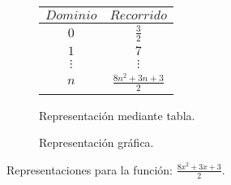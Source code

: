 \begin{figure}[h]
\centering
\begin{subfigure}[A]{0.3\textwidth}
\centering
\begin{tabular}{c|c}
$Dominio$ & $Recorrido$ \\ \hline
\hline
$0$ & $\frac{3}{2}$ \\ \hline
$1$ & $7$ \\ \hline
$\vdots$ & $\vdots$ \\ \hline
$n$& $\frac{8 n^{2} + 3 n + 3}{2}$ \\ \hline
\end{tabular} 
\caption{Representación mediante tabla.}

\end{subfigure}%
\quad
\begin{subfigure}[B]{0.3\textwidth}
\centering



\caption{Representación gráfica.}

\end{subfigure}

\caption{Representaciones para la función: $\frac{8 x^{2} + 3 x + 3}{2}$.}

\end{figure}

